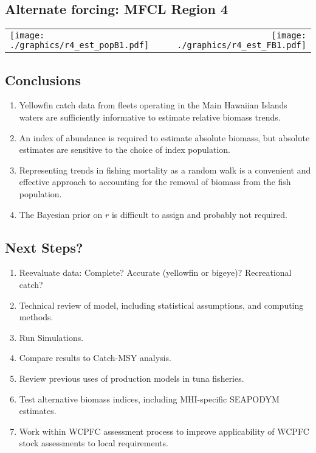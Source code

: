 \documentclass[letterpaper,KOMA,landscape,titlepage]{powersem}
\begin{document}
\begin{slide}\section{Alternate forcing: MFCL Region 4}
\label{fig:estr4}
\begin{center}
\begin{tabular}{lr}
\texttt{[image: ./graphics/r4\_est\_popB1.pdf]}&
\texttt{[image: ./graphics/r4\_est\_FB1.pdf]}\\
\end{tabular}
\end{center}
\end{slide}

\begin{slide}\section{Conclusions}
\begin{enumerate}
\item Yellowfin catch data from fleets operating in the Main Hawaiian
Islands waters are sufficiently informative to estimate relative
biomass trends.
\item An index of abundance is required to estimate absolute biomass,
but absolute estimates are sensitive to the choice of index
population.
\item Representing trends in fishing mortality as a random walk is a
convenient and effective approach to accounting for the removal of
biomass from the fish population.
\item The Bayesian prior on $r$ is difficult to assign and probably not required.
\end{enumerate}
\end{slide}

\begin{slide}\section{Next Steps?}
\begin{enumerate}
\item Reevaluate data: Complete? Accurate (yellowfin or
bigeye)? Recreational catch?
\item Technical review of model, including statistical assumptions,
and computing methods.
\item Run Simulations.
\item Compare results to Catch-MSY analysis. 
\item Review previous uses of production models in tuna fisheries.
\item Test alternative biomass indices, including MHI-specific
SEAPODYM estimates.
\item Work within WCPFC assessment process to improve applicability of
WCPFC stock assessments to local requirements.
\end{enumerate}
\end{slide}
\end{document}
